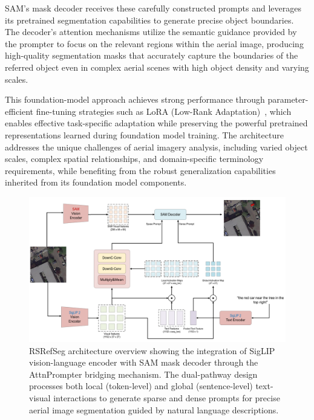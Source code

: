 SAM's mask decoder receives these carefully constructed prompts and leverages its pretrained segmentation capabilities to generate precise object boundaries. The decoder's attention mechanisms utilize the semantic guidance provided by the prompter to focus on the relevant regions within the aerial image, producing high-quality segmentation masks that accurately capture the boundaries of the referred object even in complex aerial scenes with high object density and varying scales.

This foundation-model approach achieves strong performance through parameter-efficient fine-tuning strategies such as LoRA (Low-Rank Adaptation)~\cite{lora}, which enables effective task-specific adaptation while preserving the powerful pretrained representations learned during foundation model training. The architecture addresses the unique challenges of aerial imagery analysis, including varied object scales, complex spatial relationships, and domain-specific terminology requirements, while benefiting from the robust generalization capabilities inherited from its foundation model components.

\begin{figure}[H]
\centering
\includegraphics[width=\textwidth]{Images/clipsam.png}
\caption{RSRefSeg architecture overview showing the integration of SigLIP vision-language encoder with SAM mask decoder through the AttnPrompter bridging mechanism. The dual-pathway design processes both local (token-level) and global (sentence-level) text-visual interactions to generate sparse and dense prompts for precise aerial image segmentation guided by natural language descriptions.}
\label{fig:rsrefseg_architecture}
\end{figure}

